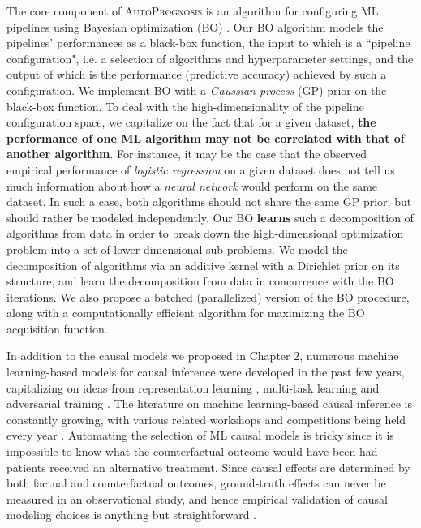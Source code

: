 \documentclass [PhD] {uclathes}
\begin{document}
The core component of {\footnotesize \textsc{AutoPrognosis}} is an algorithm for configuring ML pipelines using Bayesian optimization (BO) \cite{snoek2012practical}. Our BO algorithm models the pipelines' performances as a black-box function, the input to which is a ``pipeline configuration", i.e. a selection of algorithms and hyperparameter settings, and the output of which is the performance (predictive accuracy) achieved by such a configuration. We implement BO with a {\it Gaussian process} (GP) prior on the black-box function. To deal with the high-dimensionality of the pipeline configuration space, we capitalize on the fact that for a given dataset, {\bf the performance of one ML algorithm may not be correlated with that of another algorithm}. For instance, it may be the case that the observed empirical performance of {\it logistic regression} on a given dataset does not tell us much information about how a {\it neural network} would perform on the same dataset. In such a case, both algorithms should not share the same GP prior, but should rather be modeled independently. Our BO {\bf learns} such a decomposition of algorithms from data in order to break down the high-dimensional optimization problem into a set of lower-dimensional sub-problems. We model the decomposition of algorithms via an additive kernel with a Dirichlet prior on its structure, and learn the decomposition from data in concurrence with the BO iterations. We also propose a batched (parallelized) version of the BO procedure, along with a computationally efficient algorithm for maximizing the BO acquisition function. 

In addition to the causal models we proposed in Chapter 2, numerous machine learning-based models for causal inference were developed in the past few years, capitalizing on ideas from representation learning \cite{yao2018representation}, multi-task learning \cite{alaa2018limits} and adversarial training \cite{jjschaar}. The literature on machine learning-based causal inference is constantly growing, with various related workshops and competitions being held every year \cite{dorie2017automated}. Automating the selection of ML causal models is tricky since it is impossible to know what the counterfactual outcome would have been had patients received an alternative treatment. Since causal effects are determined by both factual and counterfactual outcomes, ground-truth effects can never be measured in an observational study, and hence empirical validation of causal modeling choices is anything but straightforward \cite{stuart2013estimating}.
\end{document}
